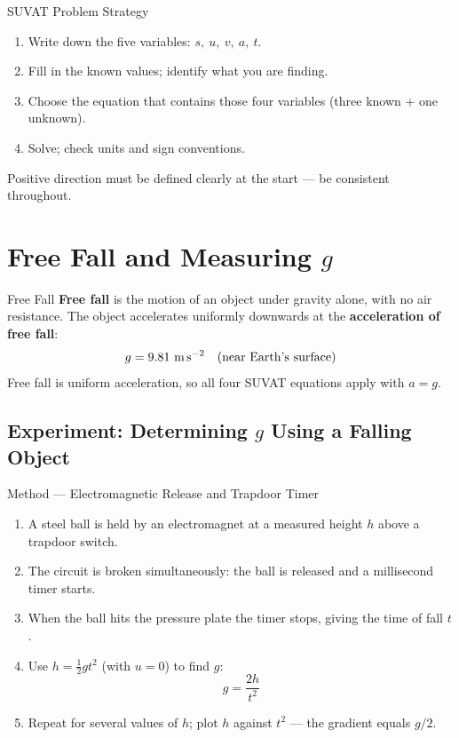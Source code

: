 \begin{keybox}{SUVAT Problem Strategy}
\begin{enumerate}[itemsep=2pt]
  \item Write down the five variables: $s,\ u,\ v,\ a,\ t$.
  \item Fill in the known values; identify what you are finding.
  \item Choose the equation that contains those four variables (three known + one unknown).
  \item Solve; check units and sign conventions.
\end{enumerate}
Positive direction must be defined clearly at the start — be consistent throughout.
\end{keybox}



\section{Free Fall and Measuring \texorpdfstring{$g$}{g}}

\begin{definitionbox}{Free Fall}
\textbf{Free fall} is the motion of an object under gravity alone, with no air resistance. The object accelerates uniformly downwards at the \textbf{acceleration of free fall}:
$$g = 9.81\ \text{m\,s}^{-2} \quad \text{(near Earth's surface)}$$
Free fall is uniform acceleration, so all four SUVAT equations apply with $a = g$.
\end{definitionbox}

\pagebreak

\subsection{Experiment: Determining \texorpdfstring{$g$}{g} Using a Falling Object}

\begin{keybox}{Method — Electromagnetic Release and Trapdoor Timer}
\begin{enumerate}[itemsep=3pt]
  \item A steel ball is held by an electromagnet at a measured height $h$ above a trapdoor switch.
  \item The circuit is broken simultaneously: the ball is released and a millisecond timer starts.
  \item When the ball hits the pressure plate the timer stops, giving the time of fall $t$.
  \item Use $h = \tfrac{1}{2}gt^2$ (with $u = 0$) to find $g$:
  $$g = \frac{2h}{t^2}$$
  \item Repeat for several values of $h$; plot $h$ against $t^2$ — the gradient equals $g/2$.
\end{enumerate}
\end{keybox}

